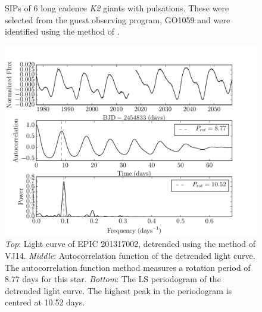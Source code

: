 \documentclass[useAMS, usenatbib, preprint, 12pt]{aastex}
\begin{document}
\begin{figure}
\begin{center}
{        }
    \end{center}
    \caption{SIPs of 6 long cadence {\it K2} giants with pulsations. These
	     were selected from the guest observing program, GO1059 and were
	     identified using the method of \citet{Huber2009}.
\label{fig:astero_examples}}
\end{figure}

\begin{figure}
\begin{center}
\includegraphics[width=6in, clip=true]{rotation_poster_child.pdf}
\caption{{\it Top}: Light curve of EPIC 201317002, detrended using the method
of VJ14. {\it Middle}: Autocorrelation function of the
detrended light curve. The autocorrelation function method measures a rotation
period of 8.77 days for this star. {\it Bottom}: The LS periodogram
of the detrended light curve. The highest peak in the periodogram is centred at
10.52 days.}
\label{fig:rotation_poster_child}
\end{center}
\end{figure}
\end{document}
